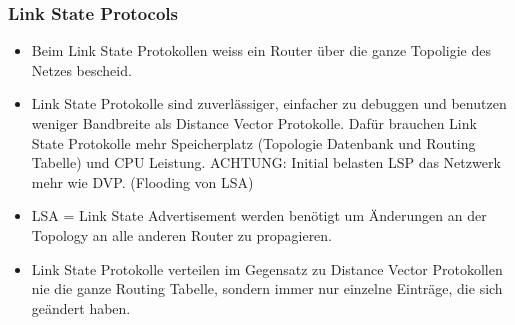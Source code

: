 \subsubsection{Link State Protocols}
\begin{itemize}
	\item Beim Link State Protokollen weiss ein Router über die ganze Topoligie des Netzes bescheid.
	\item Link State Protokolle sind zuverlässiger, einfacher zu debuggen und benutzen weniger Bandbreite als Distance Vector Protokolle. Dafür brauchen Link State Protokolle mehr Speicherplatz (Topologie Datenbank und Routing Tabelle) und CPU Leistung. ACHTUNG: Initial belasten LSP das Netzwerk mehr wie DVP. (Flooding von LSA)
	\item LSA = Link State Advertisement werden benötigt um Änderungen an der Topology an alle anderen Router zu propagieren.
	\item Link State Protokolle verteilen im Gegensatz zu Distance Vector Protokollen nie die ganze Routing Tabelle, sondern immer nur einzelne Einträge, die sich geändert haben.
\end{itemize}

